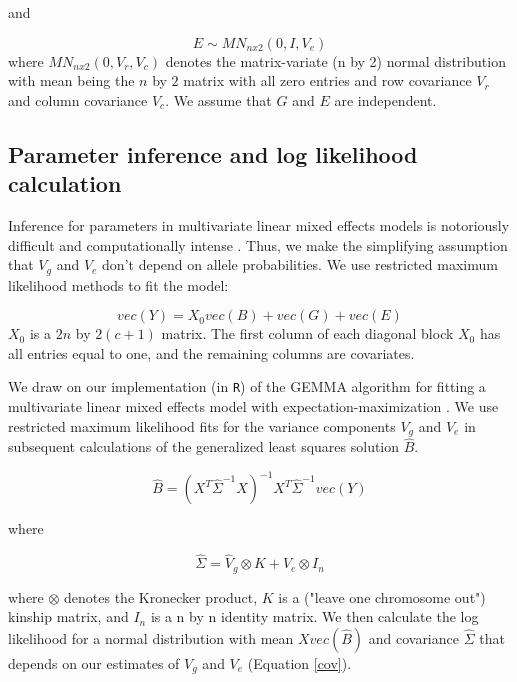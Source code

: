 \documentclass[12pt,twoside, lineno]{gsajnl}
\begin{document}
and

\begin{equation}
E \sim MN_{nx2}(0, I, V_e)
\label{eqn:model3}
\end{equation}
where $MN_{n x 2}(0, V_r, V_c)$ denotes the matrix-variate (n by 2)
normal distribution with mean being the $n$ by $2$ matrix with all
zero entries and row covariance $V_r$ and column covariance $V_c$. We
assume that $G$ and $E$ are independent.


\subsection{Parameter inference and log likelihood calculation}

Inference for parameters in multivariate linear mixed effects models
is notoriously difficult and computationally intense
\citep{meyer1989restricted,meyer1991estimating}. Thus, we make the
simplifying assumption that $V_g$ and $V_e$ don't depend on allele
probabilities. We use restricted maximum likelihood methods to fit the
model:

\begin{equation}
vec(Y) = X_0vec(B) + vec(G) + vec(E)
\label{model}
\end{equation}
$X_0$ is a $2n$ by $2(c + 1)$ matrix. The first column of each
diagonal block $X_0$ has all entries equal to one, and the remaining
columns are covariates.

We draw on our implementation \citep{gemma2} (in \texttt{R}) of the
GEMMA algorithm for fitting a multivariate linear mixed effects model
with expectation-maximization \citep{zhou2014efficient}. We use
restricted maximum likelihood fits for the variance components $V_g$
and $V_e$ in subsequent calculations of the generalized least squares
solution $\hat B$.

\begin{equation}
    \hat B = (X^T\hat\Sigma^{-1}X)^{-1}X^T\hat\Sigma^{-1}vec(Y)
\end{equation}

\noindent where

\begin{equation}
    \hat\Sigma = \hat V_g \otimes K + \hat V_e \otimes I_n
    \label{cov}
\end{equation}

\noindent where $\otimes$ denotes the Kronecker product, $K$ is a
("leave one chromosome out") kinship matrix, and $I_n$ is a n by n
identity matrix. We then calculate the log likelihood for a normal
distribution with mean $X vec(\hat B)$ and covariance $\hat \Sigma$
that depends on our estimates of $V_g$ and $V_e$ (Equation \ref{cov}).
\end{document}
